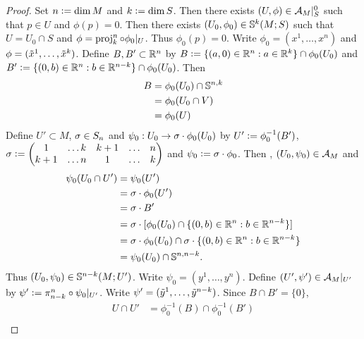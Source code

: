 \documentclass{book}
\begin{document}
	\begin{proof}
		Set $n \defeq \dim M$ and $k \defeq \dim S$. 
		Then there exists $(U, \phi) \in \MA_M|_S^0$ such that $p \in U$ and $\phi(p) = 0$. Then there exists $(U_0, \phi_0) \in \S^k(M;S)$ such that $U = U_0 \cap S$ and $\phi = \prj^n_k \circ \phi_0|_U$. Thus $\phi_0(p) = 0$. Write $\phi_0 = (x^1, \ldots, x^n)$ and $\phi = (\tl{x}^1, \ldots, \tl{x}^k )$. 
		Define $B, B' \subset \R^n$ by $B \defeq \{(a, 0) \in \R^n: a \in \R^k\} \cap \phi_0(U_0)$ and $B' \defeq \{(0, b) \in \R^n: b \in \R^{n-k}\} \cap \phi_0(U_0)$. Then 
		\begin{align*}
			B 
			& = \phi_0(U_0) \cap \S^{n,k} \\
			& = \phi_0(U_0 \cap V) \\
			& = \phi_0(U)
		\end{align*}
		Define $U' \subset M$, $\sig \in S_n$ and $\psi_0:U_0 \rightarrow \sig \cdot \phi_0(U_0)$ by $U' \defeq \phi_0^{-1}(B')$, $\sig \defeq 
		\begin{pmatrix}
			1   & \ldots k & k+1 &  \ldots &  n \\
			k+1 & \ldots n & 1   &  \ldots &  k
		\end{pmatrix}$ 
		and $\psi_0 \defeq \sig \cdot \phi_0$. Then , $(U_0, \psi_0) \in \MA_M$ and 
		\begin{align*}
			\psi_0(U_0 \cap U') 
			& = \psi_0(U') \\
			& = \sig \cdot \phi_0 (U') \\
			& = \sig \cdot B' \\
			& = \sig \cdot [\phi_0(U_0) \cap \{(0, b) \in \R^n: b \in \R^{n-k}\}] \\
			& = \sig \cdot \phi_0(U_0) \cap \sig \cdot \{(0, b) \in \R^n: b \in \R^{n-k}\}  \\
			& = \psi_0(U_0) \cap \S^{n, n-k}.
		\end{align*}
		Thus $(U_0, \psi_0) \in \S^{n-k}(M; U')$. Write $\psi_0 = (y^1, \ldots, y^n)$. Define $(U', \psi') \in \MA_M|_{U'}$ by $\psi' \defeq \pi^n_{n-k} \circ \psi_0|_{U'}$. Write $\psi' = (\tl{y}^1, \ldots, \tl{y}^{n-k})$. Since $B \cap B' = \{0\}$, 
		\begin{align*}
			U \cap U' 
			& = \phi_0^{-1}(B) \cap \phi_0^{-1}(B') \\

\end{align*}
\end{proof}
\end{document}
